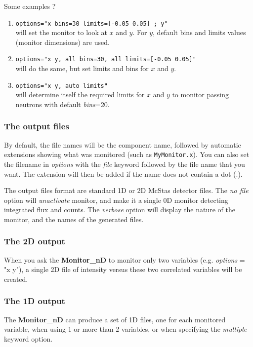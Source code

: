 Some examples ?
\begin{enumerate}
\item{\texttt{options="x bins=30 limits=[-0.05 0.05] ; y"} \\
    will set the monitor to look at $x$ and $y$. For $y$, default bins
    and limits values (monitor dimensions) are used.}
\item{\texttt{options="x y, all bins=30, all limits=[-0.05 0.05]"} \\
    will do the same, but set limits and bins for $x$ and $y$.}
\item{\texttt{options="x y, auto limits"} \\
    will determine itself the required limits for $x$ and $y$ to monitor
    passing neutrons with default {\it bins}=20.}
\end{enumerate}

\subsubsection{The output files}

By default, the file names will be the component name, followed by
automatic extensions showing what was monitored (such as
\texttt{MyMonitor.x}). You can also set the filename in {\it options}
with the {\it file} keyword followed by the file name that you want. The
extension will then be added if the name does not contain a dot (.).

The output files format are standard 1D or 2D McStas detector files.
The {\it no file} option will {\it unactivate} monitor, and make it a
single 0D monitor detecting integrated flux and counts.
The {\it verbose} option will display the nature of the monitor, and the
names of the generated files.

\subsubsection{The 2D output}

When you ask the {\bf Monitor\_nD} to monitor only two variables (e.g.
{\it options} = "x y"), a single 2D file of intensity versus these two
correlated variables will be created.

\subsubsection{The 1D output}

The {\bf Monitor\_nD} can produce a set of 1D files, one for each
monitored variable, when using 1 or more than 2 variables, or when
specifying the {\it multiple} keyword option.

